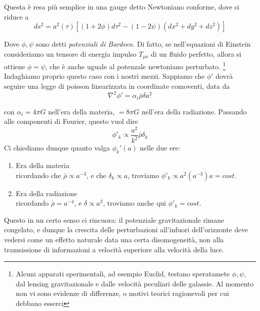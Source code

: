 \documentclass{report}
\begin{document}
Questa è resa più semplice in una gauge detto Newtoniano conforme, dove si riduce a 
\begin{equation}
    ds^2 = a^2(\tau)\left[(1+2\phi)d\tau^2 - (1-2\psi)(dx^2 + dy^2 + dz^2) \right]
\end{equation}

Dove $\phi, \psi$ sono detti \emph{potenziali di Bardeen}. Di fatto, se nell'equazioni di Einstein consideriamo un tensore di energia impulso $T_{\mu \nu}$ di un fluido perfetto, allora si ottiene $\phi = \psi$, che è anche uguale al potenzale newtoniano perturbato. \footnote{Alcuni apparati sperimentali, ad esempio Euclid, testano speratamete $\phi, \psi$, dal lensing gravitazionale e dalle velocità peculiari delle galassie. Al momento non vi sono evidenze di differenze, o motivi teorici ragionevoli per cui debbano esserci}\\

Indaghiamo proprio questo caso con i nostri mezzi. Sappiamo che $\phi'$ dovrà seguire una legge di poisson linearizzata in coordinate comoventi, data da 
\begin{equation}
    \nabla^2\phi' = \alpha_i\bar{\rho}\delta a^2
\end{equation}

con $\alpha_i = 4\pi G$ nell'era della materia, $=8\pi G$ nell'era della radiazione. Passando alle componenti di Fourier, questo vuol dire 
\begin{equation}
    \phi'_k \propto \frac{a^2}{k^2}\bar{\rho}\delta_k
\end{equation}
Ci chiediamo dunque quanto valga $\phi_k'(a)$ nelle due ere: 
\begin{enumerate}
    \item   Era della materia\\ 
    ricordando che $\bar{\rho} \propto a^{-3}$, e che $\delta_k \propto a$, troviamo $\phi'_k \propto a^2(a^{-3})a = cost. $
    \item Era della radiazione \\
    ricordando $\bar{\rho} = a^{-4}$, e $\delta \propto a^2$, troviamo anche qui $\phi'_k = cost.$
\end{enumerate}

Questo in un certo senso ci rincuora: il potenziale gravitazionale rimane congelato, e dunque la crescita delle perturbazioni all'infuori dell'orizzonte deve vedersi come un effetto naturale data una certa disomogeneità, non alla tramsissione di informazioni a velocità superiore alla velocità della luce. 
\end{document}
